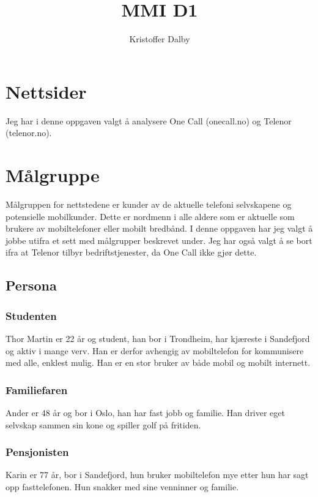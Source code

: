 \documentclass[a4paper, 10pt]{article}
\title{MMI D1}
\author{Kristoffer Dalby}
\date{}
\begin{document}
\maketitle

\thispagestyle{empty}
\newpage
{}
\setcounter{page}{1}

\section*{Nettsider}
Jeg har i denne oppgaven valgt å analysere One Call (onecall.no) og Telenor (telenor.no).

\section*{Målgruppe}
Målgruppen for nettstedene er kunder av de aktuelle telefoni selvskapene og potensielle mobilkunder. Dette er nordmenn i alle aldere som er aktuelle som brukere av mobiltelefoner eller mobilt bredbånd. I denne oppgaven har jeg valgt å jobbe utifra et sett med målgrupper beskrevet under. Jeg har også valgt å se bort ifra at Telenor tilbyr bedriftstjenester, da One Call ikke gjør dette.\\

\subsection*{Persona}
\subsubsection*{Studenten}
Thor Martin er 22 år og student, han bor i Trondheim, har kjæreste i Sandefjord og aktiv i mange verv. Han er derfor avhengig av mobiltelefon for kommunisere med alle, enklest mulig. Han er en stor bruker av både mobil og mobilt internett.

\subsubsection*{Familiefaren}
Ander er 48 år og bor i Oslo, han har fast jobb og familie. Han driver eget selvskap sammen sin kone og spiller golf på fritiden.

\subsubsection*{Pensjonisten}
Karin er 77 år, bor i Sandefjord, hun bruker mobiltelefon mye etter hun har sagt opp fasttelefonen. Hun snakker med sine venninner og familie. 
\end{document}
